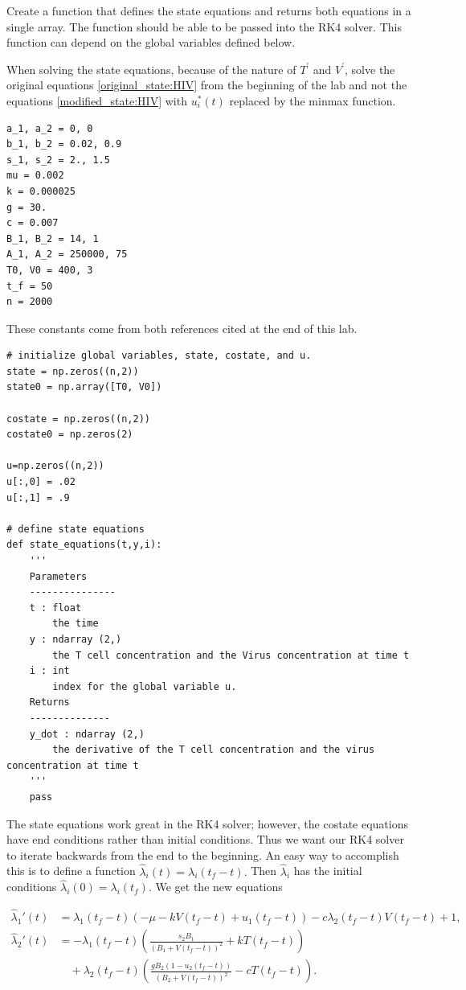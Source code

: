 \begin{problem}
Create a function that defines the state equations and returns both equations in a single array. The function should be able to be passed into the RK4 solver. This function can depend on the global variables defined below.

\begin{warn}
When solving the state equations, because of the nature of $T^\prime$ and $V^\prime$, solve the original equations \eqref{original_state:HIV} from the beginning of the lab and not the equations \eqref{modified_state:HIV} with $u_i^*(t)$ replaced by the minmax function.
\end{warn}

\begin{lstlisting}
a_1, a_2 = 0, 0
b_1, b_2 = 0.02, 0.9
s_1, s_2 = 2., 1.5
mu = 0.002
k = 0.000025
g = 30.
c = 0.007
B_1, B_2 = 14, 1
A_1, A_2 = 250000, 75
T0, V0 = 400, 3
t_f = 50
n = 2000
\end{lstlisting}
These constants come from both references cited at the end of this lab. 

\begin{lstlisting}
# initialize global variables, state, costate, and u.
state = np.zeros((n,2))
state0 = np.array([T0, V0])
	
costate = np.zeros((n,2))
costate0 = np.zeros(2)

u=np.zeros((n,2))
u[:,0] = .02
u[:,1] = .9

# define state equations
def state_equations(t,y,i):
	'''
	Parameters
	---------------
	t : float
		the time
	y : ndarray (2,)
		the T cell concentration and the Virus concentration at time t
	i : int
		index for the global variable u.
	Returns
	--------------
	y_dot : ndarray (2,)
		the derivative of the T cell concentration and the virus concentration at time t
	'''
	pass
\end{lstlisting}
\label{problem:hiv:state}
\end{problem}


The state equations work great in the RK4 solver; however, the costate equations have end conditions rather than initial conditions. Thus we want our RK4 solver to iterate backwards from the end to the beginning. An easy way to accomplish this is to define a function $ \hat{\lambda}_i(t)=\lambda_i(t_f - t).$ Then $\hat{\lambda}_i$ has the initial conditions $\hat{\lambda}_i(0) = \lambda_i(t_f)$. We get the new equations

\begin{align*}
\hat{\lambda}_1'(t) &=\lambda_1(t_f-t)\left(-\mu - kV(t_f-t) + u_{1}(t_f-t)\right) - c\lambda_2(t_f-t)V(t_f-t) + 1, \\
\hat{\lambda}_2'(t) &= -\lambda_1(t_f-t)\left(\frac{s_2B_1}{(B_1+V(t_f-t))^2}+kT(t_f-t)\right) \\
&\quad+ \lambda_2(t_f-t)\left(\frac{gB_2(1-u_2(t_f-t))}{(B_2 + V(t_f-t))^2} - cT(t_f-t)\right).
\end{align*}

